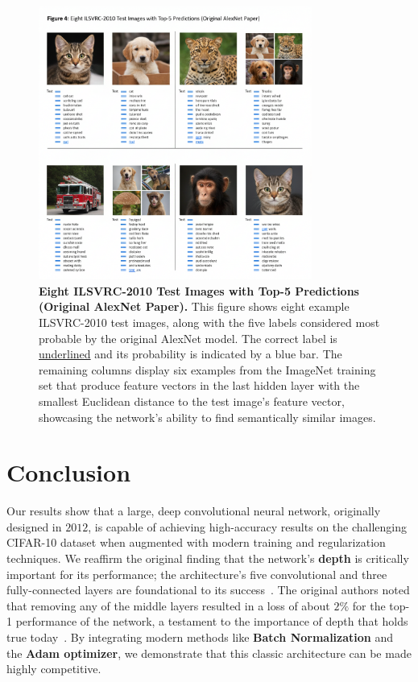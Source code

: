 \documentclass{article}
\begin{document}
\begin{figure}[h!]
    \centering
    \includegraphics[width=0.8\textwidth]{images/figure4_predictions.png} 
    \caption{
        \textbf{Eight ILSVRC-2010 Test Images with Top-5 Predictions (Original AlexNet Paper).} This figure shows eight example ILSVRC-2010 test images, along with the five labels considered most probable by the original AlexNet model. The correct label is \underline{underlined} and its probability is indicated by a blue bar. The remaining columns display six examples from the ImageNet training set that produce feature vectors in the last hidden layer with the smallest Euclidean distance to the test image's feature vector, showcasing the network's ability to find semantically similar images.
    }
    \label{fig:top5_predictions}
\end{figure}

\newpage

\section{Conclusion}
\noindent
Our results show that a large, deep convolutional neural network, originally designed in $2012$, is capable of achieving high-accuracy results on the challenging CIFAR-10 dataset when augmented with modern training and regularization techniques. We reaffirm the original finding that the network's \textbf{depth} is critically important for its performance; the architecture's five convolutional and three fully-connected layers are foundational to its success~\cite{krizhevsky2012imagenet}. The original authors noted that removing any of the middle layers resulted in a loss of about $2\%$ for the top-1 performance of the network, a testament to the importance of depth that holds true today~\cite{krizhevsky2012imagenet}. By integrating modern methods like \textbf{Batch Normalization} and the \textbf{Adam optimizer}, we demonstrate that this classic architecture can be made highly competitive.
\end{document}
